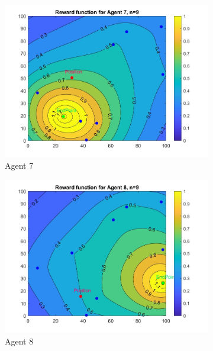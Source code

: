 \begin{figure}[h]
\begin{subfigure}[b]{0.3\textwidth}
         \includegraphics[width=\textwidth]{figures/RewardFunction7.jpg}
         \caption{Agent 7}
         \label{fig:r7}
     \end{subfigure}
     \hfill
     \begin{subfigure}[b]{0.3\textwidth}
         \centering
         \includegraphics[width=\textwidth]{figures/RewardFunction8.jpg}
         \caption{Agent 8}
         \label{fig:r8}
     \end{subfigure}
     \hfill
     \begin{subfigure}[b]{0.3\textwidth}
         \centering

\end{subfigure}
\end{figure}
